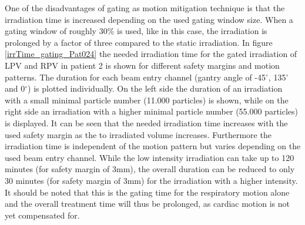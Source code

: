 \documentclass[type=dr, dr=rernat, accentcolor=tud7b,colorbacktitle, bigchapter, openright, twoside, 12pt ]{tudthesis}
\begin{document}
One of the disadvantages of gating as motion mitigation technique is that the irradiation time is increased depending on the used gating window 
size. When a gating window of roughly 30\% is used, like in this case, the irradiation is prolonged by a factor of three compared to the static 
irradiation. In figure \ref{irrTime_gating_Pat024} the needed irradiation time for the gated irradiation of LPV and RPV in patient 2 is shown for 
different safety margins and motion patterns. The duration for each beam entry channel (gantry angle of -45$^{\circ}$, 135$^{\circ}$ and 0$^{\circ}$) 
is plotted individually. On the left side the duration of an irradiation with a small minimal particle number (11.000 particles) is shown, 
while on the right side an irradiation with a higher minimal particle number (55.000 particles) is displayed. \newline
\newline
It can be seen that the needed irradiation time increases with the used safety margin as the to irradiated volume increases. Furthermore 
the irradiation time is independent of the motion pattern but varies depending on the used beam entry channel. While the low intensity 
irradiation can take up to 120 minutes (for safety margin of 3mm), the overall duration can be reduced to only 30 minutes (for safety margin 
of 3mm) for the irradiation with a higher intensity. It should be noted that this is the gating time for the respiratory motion alone and 
the overall treatment time will thus be prolonged, as cardiac motion is not yet compensated for. 

\vspace*{0.6cm}

 
\end{document}
